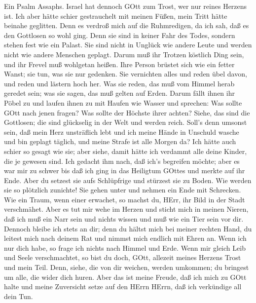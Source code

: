  Ein Psalm Assaphs. Israel hat dennoch GOtt zum Trost, wer
nur reines Herzens ist.  Ich aber hätte schier gestrauchelt
mit meinen Füßen, mein Tritt hätte beinahe geglitten.  Denn
es verdroß mich auf die Ruhmredigen, da ich sah, daß es den Gottlosen so
wohl ging.  Denn sie sind in keiner Fahr des Todes, sondern
stehen fest wie ein Palast.  Sie sind nicht in Unglück wie
andere Leute und werden nicht wie andere Menschen geplagt. 
Darum muß ihr Trotzen köstlich Ding sein, und ihr Frevel muß wohlgetan
heißen.  Ihre Person brüstet sich wie ein fetter Wanst; sie
tun, was sie nur gedenken.  Sie vernichten alles und reden
übel davon, und reden und lästern hoch her.  Was sie reden,
das muß vom Himmel herab geredet sein; was sie sagen, das muß gelten auf
Erden.  Darum fällt ihnen ihr Pöbel zu und laufen ihnen zu
mit Haufen wie Wasser  und sprechen: Was sollte GOtt nach
jenen fragen? Was sollte der Höchste ihrer achten?  Siehe,
das sind die Gottlosen; die sind glückselig in der Welt und werden
reich.  Soll's denn umsonst sein, daß mein Herz unsträflich
lebt und ich meine Hände in Unschuld wasche  und bin
geplagt täglich, und meine Strafe ist alle Morgen da?  Ich
hätte auch schier so gesagt wie sie; aber siehe, damit hätte ich
verdammt alle deine Kinder, die je gewesen sind.  Ich
gedacht ihm nach, daß ich's begreifen möchte; aber es war mir zu schwer
 bis daß ich ging in das Heiligtum GOttes und merkte auf
ihr Ende.  Aber du setzest sie aufs Schlüpfrige und
stürzest sie zu Boden.  Wie werden sie so plötzlich
zunichte! Sie gehen unter und nehmen ein Ende mit Schrecken.
 Wie ein Traum, wenn einer erwachet, so machst du, HErr,
ihr Bild in der Stadt verschmähet.  Aber es tut mir wehe im
Herzen und sticht mich in meinen Nieren,  daß ich muß ein
Narr sein und nichts wissen und muß wie ein Tier sein vor dir.
 Dennoch bleibe ich stets an dir; denn du hältst mich bei
meiner rechten Hand,  du leitest mich nach deinem Rat und
nimmst mich endlich mit Ehren an.  Wenn ich nur dich habe,
so frage ich nichts nach Himmel und Erde.  Wenn mir gleich
Leib und Seele verschmachtet, so bist du doch, GOtt, allezeit meines
Herzens Trost und mein Teil.  Denn, siehe, die von dir
weichen, werden umkommen; du bringest um alle, die wider dich huren.
 Aber das ist meine Freude, daß ich mich zu GOtt halte und
meine Zuversicht setze auf den HErrn HErrn, daß ich verkündige all dein
Tun.

